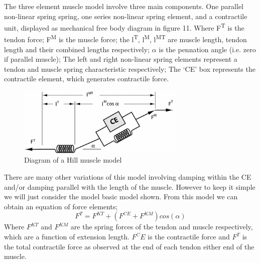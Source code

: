 The three element muscle model involve three main components. One parallel non-linear spring spring, one series non-linear spring element, and a contractile unit, displayed as mechanical free body diagram in figure 11. Where  F\textsuperscript{T} is the tendon force; F\textsuperscript{M} is the muscle force; the l\textsuperscript{T}, l\textsuperscript{M}, l\textsuperscript{MT} are muscle length, tendon length and their combined lengths respectively; $\alpha$ is the pennation angle (i.e. zero if parallel muscle); The left and right non-linear spring elements represent a tendon and muscle spring characteristic respectively; The `CE' box represents the contractile element, which generates contractile force. 
\begin{figure}[h!]
  \centering
  \includegraphics[width=8cm]{Figures/hill_type_muscle_model.png}
  \caption{Diagram of a Hill muscle model\citep{Arnold2010}}
  \label{fig:Muscle}
\end{figure}
There are many other variations of this model involving damping within the CE and/or damping parallel with the length of the muscle\citep{Arslan2019}. However to keep it simple we will just consider the model basic model shown. From this model we can obtain an equation of force elements;
\begin{equation}
    F^T = F^{KT} + (F^{CE} + F^{KM})cos(\alpha)
\end{equation}
Where $F^{KT}$ and $F^{KM}$ are the spring forces of the tendon and muscle respectively, which are a function of extension length. $F^CE$ is the contractile force and $F^T$ is the total contractile force as observed at the end of each tendon either end of the muscle.


